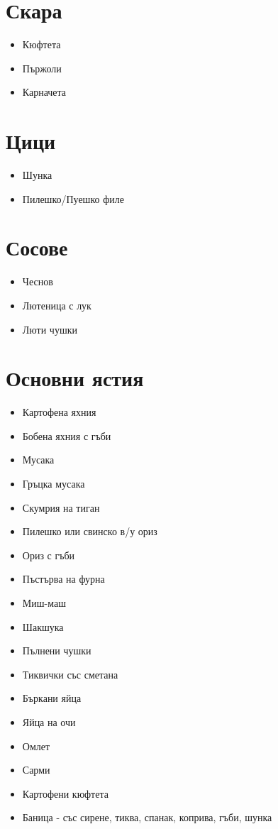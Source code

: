 \documentclass{article}
\newenvironment{mylist}
{
  \begin{itemize}
  \setlength{\itemsep}{1pt}
  \setlength{\parskip}{0pt}
  \setlength{\parsep}{0pt}
}
{
\end{itemize}
}
\begin{document}
\begin{multicols}{2}
\section{Скара}
\begin{mylist}
    \item{Кюфтета}
    \item{Пържоли}
    \item{Карначета}
\end{mylist}

\section{Цици}
\begin{mylist}
    \item{Шунка}
    \item{Пилешко/Пуешко филе}
\end{mylist}

\section{Сосове}
\begin{mylist}
    \item{Чеснов}
    \item{Лютеница с лук}
    \item{Люти чушки}
\end{mylist}

\section{Основни ястия}
\begin{mylist}
    \item{Картофена яхния}
    \item{Бобена яхния с гъби}
    \item{Мусака}
    \item{Гръцка мусака}
    \item{Скумрия на тиган}
    \item{Пилешко или свинско в/у ориз}
    \item{Ориз с гъби}
    \item{Пъстърва на фурна}
    \item{Миш-маш}
    \item{Шакшука}
    \item{Пълнени чушки}
    \item{Тиквички със сметана}
    \item{Бъркани яйца}
    \item{Яйца на очи}
    \item{Омлет}
    \item{Сарми}
    \item{Картофени кюфтета}
    \item{Баница - със сирене, тиква, спанак, коприва, гъби, шунка}
\end{mylist}


\end{multicols}
\end{document}
